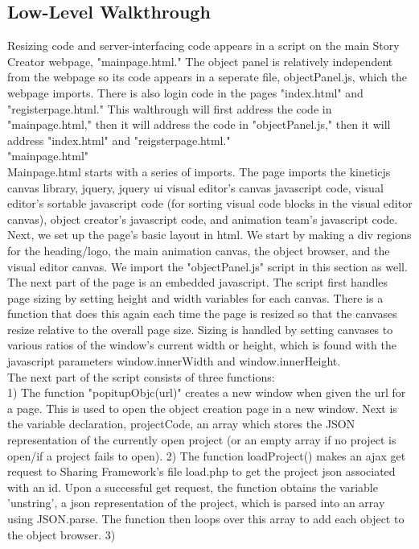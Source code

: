 \documentclass[12pt]{article}
\begin{document}
\subsection{Low-Level Walkthrough}

Resizing code and server-interfacing code appears in a script on the main Story Creator webpage, "mainpage.html." The object panel is relatively independent from the webpage so its code appears in a seperate file, objectPanel.js, which the webpage imports. There is also login code in the pages "index.html" and "registerpage.html." This walthrough will first address the code in "mainpage.html," then it will address the code in "objectPanel.js," then it will address "index.html" and "reigsterpage.html." \\

"mainpage.html" \\

Mainpage.html starts with a series of imports. The page imports the kineticjs canvas library, jquery, jquery ui visual editor's canvas javascript code, visual editor's sortable javascript code (for sorting visual code blocks in the visual editor canvas), object creator's javascript code, and animation team's javascript code. \\

Next, we set up the page's basic layout in html. We start by making a div regions for the heading/logo, the main animation canvas, the object browser, and the visual editor canvas. We import the "objectPanel.js" script in this section as well. \\

The next part of the page is an embedded javascript. The script first handles page sizing by setting height and width variables for each canvas. There is a function that does this again each time the page is resized so that the canvases resize relative to the overall page size. Sizing is handled by setting canvases to various ratios of the window's current width or height, which is found with the javascript parameters window.innerWidth and window.innerHeight. \\

The next part of the script consists of three functions: \\

1) The function "popitupObjc(url)" creates a new window when given the url for a page. This is used to open the object creation page in a new window. Next is the variable declaration, projectCode, an array which stores the JSON representation of the currently open project (or an empty array if no project is open/if a project fails to open). 2) The function loadProject() makes an ajax get request to Sharing Framework's file load.php to get the project json associated with an id. Upon a successful get request, the function obtains the variable 'unstring', a json representation of the project, which is parsed into an array using JSON.parse. The function then loops over this array to add each object to the object browser. 3) \\
\end{document}
